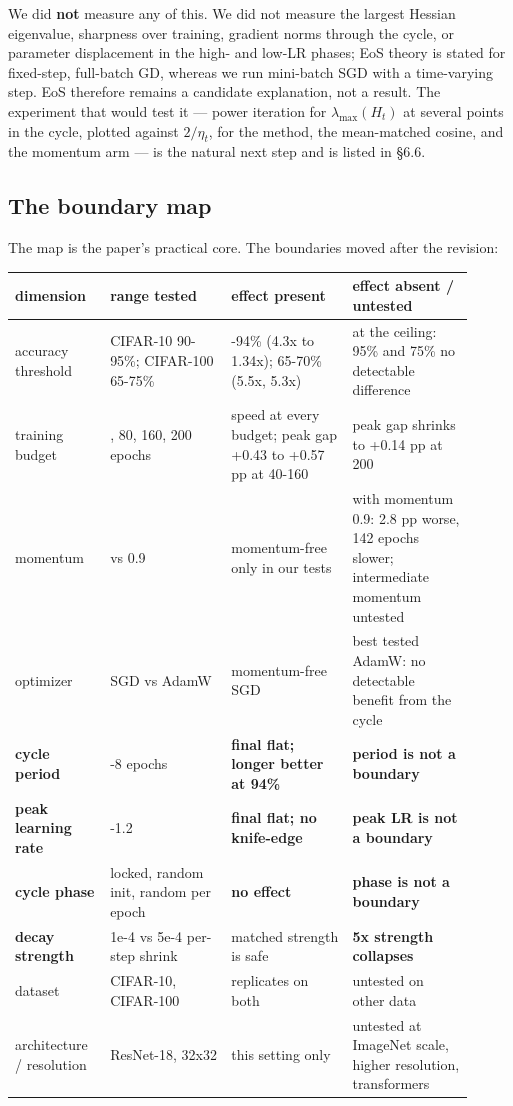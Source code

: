 \documentclass[11pt,a4paper]{article}
\begin{document}
We did \textbf{not} measure any of this. We did not measure the largest Hessian eigenvalue, sharpness over training, gradient norms through the cycle, or parameter displacement in the high- and low-LR phases; EoS theory is stated for fixed-step, full-batch GD, whereas we run mini-batch SGD with a time-varying step. EoS therefore remains a candidate explanation, not a result. The experiment that would test it --- power iteration for $\lambda_{\max}(H_t)$ at several points in the cycle, plotted against $2/\eta_t$, for the method, the mean-matched cosine, and the momentum arm --- is the natural next step and is listed in \S{}6.6.

\subsection{The boundary map}
The map is the paper's practical core. The boundaries moved after the revision:

\begin{center}
\small
\begin{tabular}{@{}>{\raggedright\arraybackslash}p{0.180\linewidth}>{\raggedright\arraybackslash}p{0.243\linewidth}>{\raggedright\arraybackslash}p{0.243\linewidth}>{\raggedright\arraybackslash}p{0.243\linewidth}@{}}
\toprule
\textbf{dimension} & \textbf{range tested} & \textbf{effect present} & \textbf{effect absent / untested} \\
\midrule
accuracy threshold & CIFAR-10 90-95\%; CIFAR-100 65-75\% & 90-94\% (4.3x to 1.34x); 65-70\% (5.5x, 5.3x) & at the ceiling: 95\% and 75\% no detectable difference \\
training budget & 40, 80, 160, 200 epochs & speed at every budget; peak gap +0.43 to +0.57 pp at 40-160 & peak gap shrinks to +0.14 pp at 200 \\
momentum & 0 vs 0.9 & momentum-free only in our tests & with momentum 0.9: 2.8 pp worse, 142 epochs slower; intermediate momentum untested \\
optimizer & SGD vs AdamW & momentum-free SGD & best tested AdamW: no detectable benefit from the cycle \\
\textbf{cycle period} & 0.25-8 epochs & \textbf{final flat; longer better at 94\%} & \textbf{period is not a boundary} \\
\textbf{peak learning rate} & 0.4-1.2 & \textbf{final flat; no knife-edge} & \textbf{peak LR is not a boundary} \\
\textbf{cycle phase} & locked, random init, random per epoch & \textbf{no effect} & \textbf{phase is not a boundary} \\
\textbf{decay strength} & 1e-4 vs 5e-4 per-step shrink & matched strength is safe & \textbf{5x strength collapses} \\
dataset & CIFAR-10, CIFAR-100 & replicates on both & untested on other data \\
architecture / resolution & ResNet-18, 32x32 & this setting only & untested at ImageNet scale, higher resolution, transformers \\
\bottomrule
\end{tabular}
\end{center}
\end{document}
